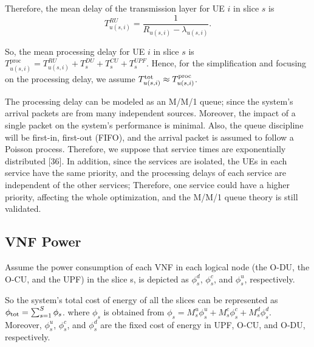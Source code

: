 \documentclass[lettersize,journal]{IEEEtran}
\begin{document}
Therefore, the mean delay of the transmission layer for UE $i$ in slice $s$ is
\begin{equation}
 T_{u(s,i)}^{RU} = \frac{1}{R_{u(s,i)} - \lambda_{u(s,i)}}.
\end{equation}

So, the mean processing delay for UE $i$ in slice $s$ is $T^{\text{proc}}_{u(s,i)} =  T^{RU}_{u(s,i)} + T^{DU}_{s} + T^{CU}_{s} + T^{UPF}_{s}.$
Hence, for the simplification and focusing on the processing delay, we assume $T^{\text{\text{tot}}}_{u(s,i)} \approx T^{\text{proc}}_{u(s,i)} $. %

The processing delay can be modeled as an M/M/1 queue; since the system's arrival packets are from many independent sources. Moreover, the impact of a single packet on the system's performance is minimal. Also, the queue discipline will be first-in, first-out (FIFO), and the arrival packet is assumed to follow a Poisson process. Therefore, we suppose that service times are exponentially distributed [36]. In addition, since the services are isolated, the UEs in each service have the same priority, and the processing delays of each service are independent of the other services; Therefore, one service could have a higher priority, affecting the whole optimization, and the M/M/1 queue theory is still validated.

\subsection{VNF Power}
Assume the power consumption of each VNF in each logical node (the O-DU, the O-CU, and the UPF) in the slice s, is depicted as $\phi_{s}^d$, $\phi_{s}^c$, and $\phi_{s}^u$, respectively.

So the system's total cost of energy of all the slices can be represented as $\textstyle \phi_{\text{\text{tot}}} = \sum_{s=1}^{S}\phi_{s}$.
where $\phi_{s}$ is obtained from $\phi_{s} = M_s^u \phi_s^u + M_s^c \phi_s^c+ M_s^d \phi_s^d.$
Moreover, $\phi_s^u$, $\phi_s^c$, and $\phi_s^d$ are the fixed cost of energy in UPF, O-CU, and O-DU, respectively.
\end{document}
